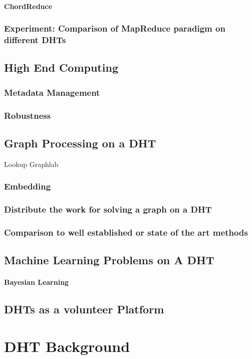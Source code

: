 \documentclass[10pt,letterpaper]{report}
\begin{document}
\subsubsection{ChordReduce}
\subsection{Experiment: Comparison of MapReduce paradigm on different DHTs}


\section{High End Computing}
\subsection{Metadata Management}
\subsection{Robustness}

\section{Graph Processing on a DHT}
Lookup Graphlab
\subsection{Embedding}
\subsection{Distribute the work for solving a graph on a DHT}
\subsection{Comparison to well established or state of the art methods}

\section{Machine Learning Problems on A DHT}
\subsubsection{Bayesian Learning}

\section{DHTs as a volunteer Platform}

\chapter{DHT Background}





\end{document}
